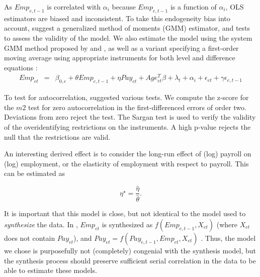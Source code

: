 As $Emp_{e,t-1}$ is correlated with $\alpha_{i}$ because $Emp_{e,t-1}$ is a function of $\alpha_{i}$, 
OLS estimators are biased and inconsistent. 
To take this endogeneity bias into account,  \textcite{RePEc:oup:restud:v:58:y:1991:i:2:p:277-297.} suggest a generalized method of moments (GMM) estimator, and tests to assess the  validity of the model.  
%
We also estimate the model using the system GMM  method proposed by \textcite{RePEc:eee:econom:v:68:y:1995:i:1:p:29-51} and \textcite{RePEc:eee:econom:v:87:y:1998:i:1:p:115-143}, as well as a variant specifying a first-order moving average using appropriate instruments for both level and difference equations  \parencite{RePEc:eee:econom:v:68:y:1995:i:1:p:29-51,RePEc:eee:econom:v:87:y:1998:i:1:p:115-143}:
%
\begin{eqnarray}	
Emp_{et}&=&\beta_{0,e} +\theta Emp_{e,t-1}+\eta Pay_{et}+Age_{et}^{T}\beta+\lambda_t+\alpha_i+\epsilon_{et}+\gamma\epsilon_{e,t-1}
\end{eqnarray}

To test for autocorrelation, \textcite{RePEc:oup:restud:v:58:y:1991:i:2:p:277-297.} suggested various tests. We compute the z-score for the $m2$ test  for zero autocorrelation in the  first-differenced errors of order two. Deviations from zero reject the test. The Sargan test is used to verify the validity of the overidentifying restrictions on the instruments. A high p-value rejects the null that the restrictions are valid.

An interesting derived effect is to consider the long-run effect of (log) payroll on (log) employment, or the elasticity of employment with respect to payroll. This can be estimated as

$$
\eta^\star = \frac{\hat{\eta}}{\hat{\theta}}.
$$

It is important that this model is close, but not identical to the model used to \textit{synthesize} the data. In \SynLBD, $Emp_{et}$ is synthesized as $f(Emp_{e,t-1},X_{et})$ (where $X_{et}$ does not contain $Pay_{et}$), and $Pay_{et} = f(Pay_{e,t-1},Emp_{et},X_{et})$ \citep[pg. 366]{KinneyEtAl2011}. Thus, the model we chose is purposefully not (completely) congenial with the synthesis model, but the synthesis process \SynLBD{} should preserve sufficient serial correlation in the data to be able to estimate these models.

